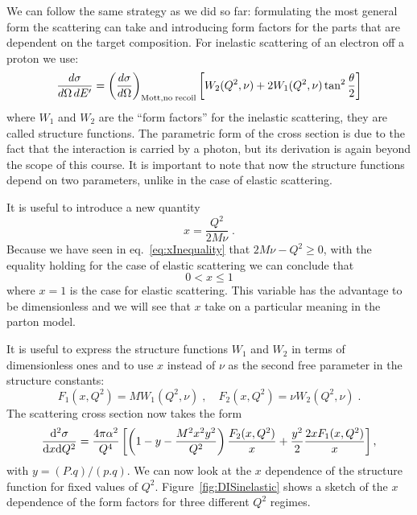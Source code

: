 \documentclass[12pt]{article}
\begin{document}
We can follow the same strategy as we did so far: formulating the most general form the scattering can take and introducing form factors for the parts that are dependent on the target composition. For inelastic scattering of an electron off a proton we use:
\[\frac{d\sigma}{d\Omega\,dE'}= \left(\frac{d\sigma}{d\Omega}\right)_{\rm  Mott, no\; recoil}\left[W_2(Q^2,\nu)+2W_1(Q^2,\nu)\tan^2\frac{\theta}{2}\right]   \]
where $W_1$ and $W_2$ are the ``form factors'' for the inelastic scattering, they are called structure functions. The parametric form of the cross section is due to the fact that the interaction is carried by a photon, but its derivation is again beyond the scope of this course. It is important to note that now the structure functions depend on two parameters, unlike in the case of elastic scattering. 

It is useful to introduce a new quantity
\[x=\frac{Q^2}{2M\nu}\;.\]
Because we have seen in eq.~\ref{eq:xInequality} that $2M\nu -Q^2\geq 0$, with the equality holding for the case of elastic scattering we can conclude that
\[0<x\leq 1\]
where $x=1$ is the case for elastic scattering. This variable has the advantage to be dimensionless and we will see that $x$ take on a particular meaning in the parton model.
 
It is useful to express the structure functions $W_1$ and $W_2$ in terms of  dimensionless ones and to use $x$ instead of $\nu$ as the second free parameter in the structure constants:
\[F_1(x,Q^2)=MW_1(Q^2,\nu)\;,\quad F_2(x,Q^2)=\nu W_2(Q^2,\nu)\;.\]
The scattering cross section now takes the form
\begin{equation}\label{eq:diffCrossSectionStructureFunction}
\frac{{\rm d}^2\sigma}{{\rm d}x{\rm d}Q^2}
 = \frac{4\pi\alpha^2}{Q^4}\left[\left(1-y-\frac{M^2x^2y^2}{Q^2}\right)\frac{F_2(x,Q^2)}x+\frac{y^2}2\frac{2xF_1(x,Q^2)}{x}\right],
\end{equation}
with $y=(P.q)/(p.q)$. We can now look at the $x$ dependence of the structure function for fixed values of $Q^2$. Figure~\ref{fig:DISinelastic} shows a sketch of the $x$ dependence of the form factors for three different $Q^2$ regimes. 
\end{document}
